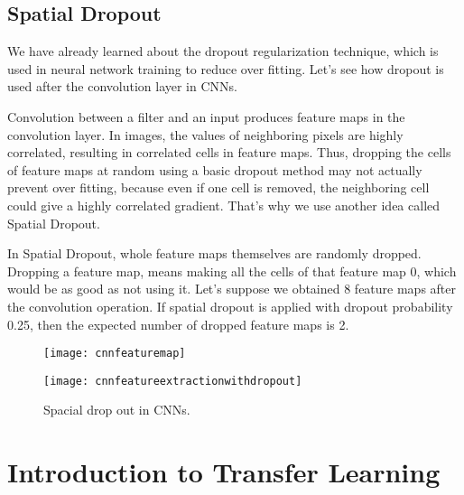 	\subsection{Spatial Dropout}
	\begin{bulletedlist}
		\item We have already learned about the dropout regularization technique, which is used in neural network training to reduce over fitting.  Let's see how dropout is used after the convolution layer in CNNs.
		\item Convolution between a filter and an input produces feature maps in the convolution layer.  In images, the values of neighboring pixels are highly correlated, resulting in correlated cells in feature maps.  Thus, dropping the cells of feature maps at random using a basic dropout method may not actually prevent over fitting, because even if one cell is removed, the neighboring cell
could give a highly correlated gradient.  That's why we use another idea called Spatial Dropout.
		\item In Spatial Dropout, whole feature maps themselves are randomly dropped.  Dropping a feature map, means making all the cells of that feature map 0, which would be as good as not using it.  Let's suppose we obtained 8 feature maps after the convolution operation. If spatial dropout is applied with dropout probability 0.25, then the expected number of dropped feature maps is 2.
	\end{bulletedlist}

	\begin{figure}[tbh]
		\centering
		\begin{minipage}{\textwidth}
		\centering
		\texttt{[image: cnnfeaturemap]}
		\end{minipage}
		\begin{minipage}{\textwidth}
		\centering
		\texttt{[image: cnnfeatureextractionwithdropout]}
		\end{minipage}
		\caption[Spacial drop out in CNNs]{Spacial drop out in CNNs.}
		\label{fig:covarianceshift}
	\end{figure}

	\section{Introduction to Transfer Learning}
